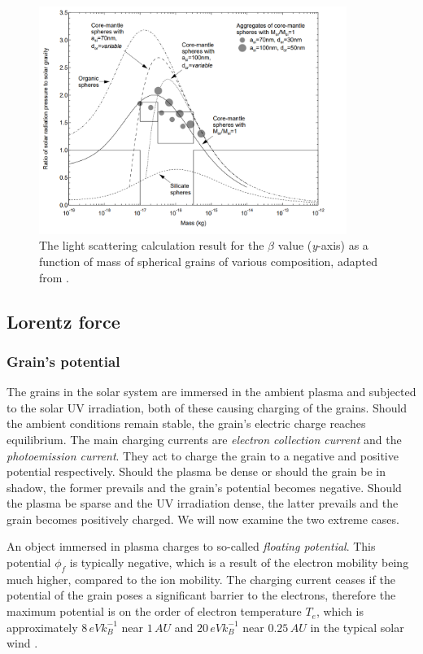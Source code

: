 \begin{figure}[h]
 	\centering
 	\includegraphics[width=10cm]{figures/kimurra_mie.png}
 	\caption{The light scattering calculation result for the $\beta$ value (\textit{y}-axis) as a function of mass of spherical grains of various composition, adapted from \cite{kimura2003composition}.}
 	\label{fig:kimura_mie}
\end{figure}

\subsection{Lorentz force}

\subsubsection{Grain's potential}

The grains in the solar system are immersed in the ambient plasma and subjected to the solar UV irradiation, both of these causing charging of the grains. Should the ambient conditions remain stable, the grain's electric charge reaches equilibrium. The main charging currents are \textit{electron collection current} and the \textit{photoemission current}. They act to charge the grain to a negative and positive potential respectively. Should the plasma be dense or should the grain be in shadow, the former prevails and the grain's potential becomes negative. Should the plasma be sparse and the UV irradiation dense, the latter prevails and the grain becomes positively charged. We will now examine the two extreme cases. 

An object immersed in plasma charges to so-called \textit{floating potential}. This potential $\phi_{f}$ is typically negative, which is a result of the electron mobility being much higher, compared to the ion mobility. The charging current ceases if the potential of the grain poses a significant barrier to the electrons, therefore the maximum potential is on the order of electron temperature $T_e$, which is approximately $8 \, \si{eV k_B^{-1}}$ near $1 \, \si{AU}$ and $20 \, \si{eV k_B^{-1}}$ near $0.25 \, \si{AU}$ in the typical solar wind \citep{guillemant2013simulation}. 

